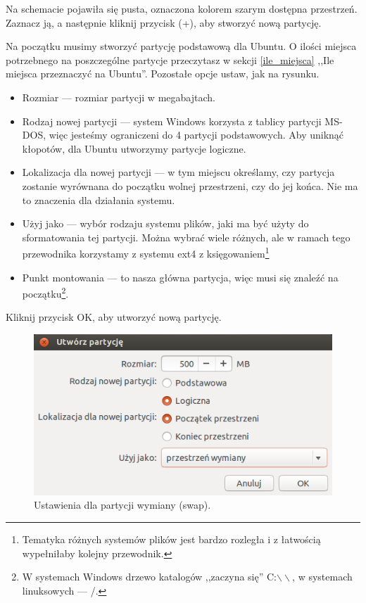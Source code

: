 Na schemacie pojawiła się pusta, oznaczona kolorem szarym \textcolor{ubuntu_orange}{dostępna przestrzeń}. Zaznacz ją, a następnie kliknij przycisk (\textcolor{ubuntu_orange}{+}), aby stworzyć nową partycję.

Na początku musimy stworzyć partycję podstawową dla Ubuntu. O ilości miejsca potrzebnego na poszczególne partycje przeczytasz w sekcji \ref{ile_miejsca} ,,Ile miejsca przeznaczyć na Ubuntu''. Pozostałe opcje ustaw, jak na rysunku.
\begin{itemize}
\item \textcolor{ubuntu_orange}{Rozmiar} --- rozmiar partycji w megabajtach.
\item \textcolor{ubuntu_orange}{Rodzaj nowej partycji} --- system Windows korzysta z tablicy partycji MS-DOS, więc jesteśmy ograniczeni do 4 partycji podstawowych. Aby uniknąć kłopotów, dla Ubuntu utworzymy partycje logiczne.
\item \textcolor{ubuntu_orange}{Lokalizacja dla nowej partycji} --- w tym miejscu określamy, czy partycja zostanie wyrównana do początku wolnej przestrzeni, czy do jej końca. Nie ma to znaczenia dla działania systemu.
\item \textcolor{ubuntu_orange}{Użyj jako} --- wybór rodzaju systemu plików, jaki ma być użyty do sformatowania tej partycji. Można wybrać wiele różnych, ale w ramach tego przewodnika korzystamy z systemu ext4 z księgowaniem\footnote{Tematyka różnych systemów plików jest bardzo rozległa i z łatwością wypełniłaby kolejny przewodnik.}
\item \textcolor{ubuntu_orange}{Punkt montowania} --- to nasza główna partycja, więc musi się znaleźć na początku\footnote{W systemach Windows drzewo katalogów ,,zaczyna się'' C:$\backslash\backslash$, w systemach linuksowych --- /.}.
\end{itemize}
Kliknij przycisk \textcolor{ubuntu_orange}{OK}, aby utworzyć nową partycję.
\clearpage
\begin{figure}
	\includegraphics[width=\linewidth]{images/instalator_partycjonowanie_gparted_dodaj_swap.png}
	\caption*{Ustawienia dla partycji wymiany (swap).}
\end{figure}

